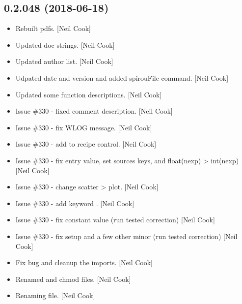 \documentclass[a4paper,10pt,english]{report}
\begin{document}
\subsection{0.2.048 (2018-06-18)}
\label{\detokenize{misc/changelog:id418}}\begin{itemize}
\item {} 
Rebuilt pdfs. {[}Neil Cook{]}

\item {} 
Updated doc strings. {[}Neil Cook{]}

\item {} 
Updated author list. {[}Neil Cook{]}

\item {} 
Udpated date and version and added spirouFile command. {[}Neil Cook{]}

\item {} 
Updated some function descriptions. {[}Neil Cook{]}

\item {} 
Issue \#330 - fixed comment description. {[}Neil Cook{]}

\item {} 
Issue \#330 - fix WLOG message. {[}Neil Cook{]}

\item {} 
Issue \#330 - add  to recipe control. {[}Neil Cook{]}

\item {} 
Issue \#330 - fix entry value, set sources keys, and float(nexp) \textendash{}\textgreater{}
int(nexp) {[}Neil Cook{]}

\item {} 
Issue \#330 - change scatter \textendash{}\textgreater{} plot. {[}Neil Cook{]}

\item {} 
Issue \#330 - add keyword . {[}Neil Cook{]}

\item {} 
Issue \#330 - fix constant value (run tested correction) {[}Neil Cook{]}

\item {} 
Issue \#330 - fix setup and a few other minor (run tested correction)
{[}Neil Cook{]}

\item {} 
Fix bug and cleanup the imports. {[}Neil Cook{]}

\item {} 
Renamed and chmod files. {[}Neil Cook{]}

\item {} 
Renaming file. {[}Neil Cook{]}


\end{itemize}
\end{document}
